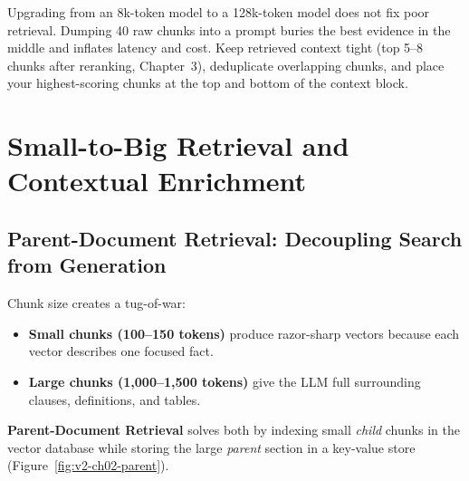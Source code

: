 \begin{productionwarningbox}
Upgrading from an 8k-token model to a 128k-token model does not fix poor retrieval. Dumping 40 raw chunks into a prompt buries the best evidence in the middle and inflates latency and cost. Keep retrieved context tight (top 5--8 chunks after reranking, Chapter~3), deduplicate overlapping chunks, and place your highest-scoring chunks at the top and bottom of the context block.
\end{productionwarningbox}

\section{Small-to-Big Retrieval and Contextual Enrichment}

\subsection{Parent-Document Retrieval: Decoupling Search from Generation}
Chunk size creates a tug-of-war:
\begin{itemize}[leftmargin=18pt]
  \item \textbf{Small chunks (100--150 tokens)} produce razor-sharp vectors because each vector describes one focused fact.
  \item \textbf{Large chunks (1,000--1,500 tokens)} give the LLM full surrounding clauses, definitions, and tables.
\end{itemize}
\textbf{Parent-Document Retrieval} solves both by indexing small \emph{child} chunks in the vector database while storing the large \emph{parent} section in a key-value store (Figure~\ref{fig:v2-ch02-parent}).

